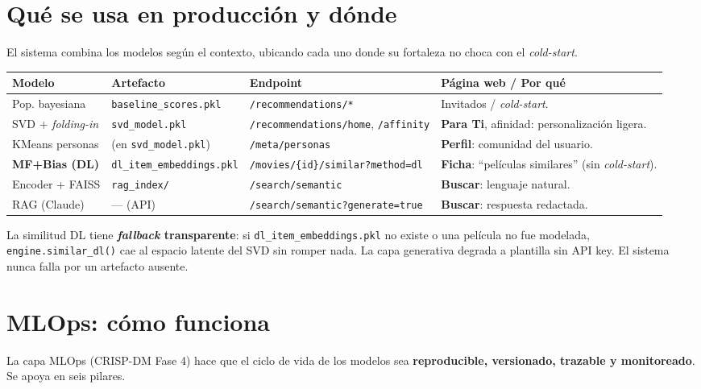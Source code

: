 \documentclass[11pt,a4paper]{article}
\newcommand{\code}[1]{\textcolor{omnidark}{\texttt{#1}}}
\begin{document}
\section{Qué se usa en producción y dónde}
\label{sec:produccion}
El sistema combina los modelos según el contexto, ubicando cada uno donde su fortaleza no choca con el \textit{cold-start}.

\begin{center}
\footnotesize
\begin{tabularx}{\textwidth}{@{}L{2.7cm} L{2.6cm} L{3.0cm} X@{}}
\toprule
\textbf{Modelo} & \textbf{Artefacto} & \textbf{Endpoint} & \textbf{Página web / Por qué} \\
\midrule
Pop. bayesiana & \code{baseline\_scores.pkl} & \code{/recommendations/*} & Invitados / \textit{cold-start}. \\
SVD + \textit{folding-in} & \code{svd\_model.pkl} & \code{/recommendations/home}, \code{/affinity} & \textbf{Para Ti}, afinidad: personalización ligera. \\
KMeans personas & (en \code{svd\_model.pkl}) & \code{/meta/personas} & \textbf{Perfil}: comunidad del usuario. \\
\textbf{MF+Bias (DL)} & \code{dl\_item\_embeddings.pkl} & \code{/movies/\{id\}/similar?method=dl} & \textbf{Ficha}: ``películas similares'' (sin \textit{cold-start}). \\
Encoder + FAISS & \code{rag\_index/} & \code{/search/semantic} & \textbf{Buscar}: lenguaje natural. \\
RAG (Claude) & --- (API) & \code{/search/semantic?generate=true} & \textbf{Buscar}: respuesta redactada. \\
\bottomrule
\end{tabularx}
\end{center}

\begin{infobox}
La similitud DL tiene \textbf{\textit{fallback} transparente}: si \code{dl\_item\_embeddings.pkl} no existe o una película no fue modelada, \code{engine.similar\_dl()} cae al espacio latente del SVD sin romper nada. La capa generativa degrada a plantilla sin API key. El sistema nunca falla por un artefacto ausente.
\end{infobox}

\section{MLOps: cómo funciona}
\label{sec:mlops}
La capa MLOps (CRISP-DM Fase 4) hace que el ciclo de vida de los modelos sea \textbf{reproducible, versionado, trazable y monitoreado}. Se apoya en seis pilares.
\end{document}

